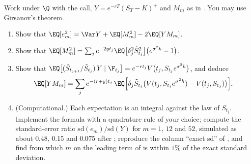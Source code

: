 \begin{exercise}\label{ex:hd-exact}
\hard Work under $\Q$ with the call, $Y=e^{-rT}(S_T-K)^+$ and $M_m$ as in
. You may use Girsanov's theorem.
\begin{enumerate}[label=(\alph*)]
  \item Show that $\EQ[e_m^2]=\Var Y+\EQ[M_m^2]-2\EQ[YM_m]$.
  \item Show that
    $\EQ[M_m^2]=\sum_je^{-2yt_j}\EQ\big[\delta_j^2\tilde S_{t_j}^2\big]\big(e^{\sigma^2h}-1\big)$.
  \item Show that $\EQ\big[(\tilde S_{t_{j+1}}/\tilde S_{t_j})\,Y\mid\F_{t_j}\big]=e^{-rt_j}V\big(t_j,S_{t_j}e^{\sigma^2h}\big)$, and
    deduce
    \[
      \EQ[YM_m]=\sum_je^{-(r+y)t_j}\,\EQ\Big[\delta_j\tilde S_{t_j}\big(V(t_j,S_{t_j}e^{\sigma^2h})-V(t_j,S_{t_j})\big)\Big].
    \]
  \item (Computational.) Each expectation is an integral against the law of $S_{t_j}$. Implement
    the formula with a quadrature rule of your choice; compute the standard-error ratio
    $\mathrm{sd}(e_m)/\mathrm{sd}(Y)$ for $m=1$, $12$ and $52$, simulated as about $0.48$, $0.15$ and $0.075$ after
    ; reproduce the column ``exact sd'' of
    , and find from which $m$ on the leading term of
     is within $1\%$ of the exact standard deviation.
\end{enumerate}
\end{exercise}
